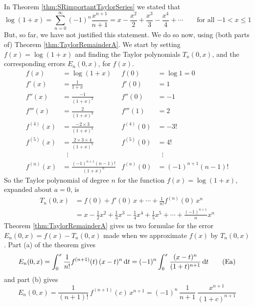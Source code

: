 \begin{eg}\label{eg:integralRemainder}
In Theorem \ref{thm:SRimportantTaylorSeries} we stated that
\begin{equation*}
\log(1+x) = \sum_{n=0}^\infty (-1)^n\frac{x^{n+1}}{n+1}
     = x-\frac{x^2}{2}+\frac{x^3}{3}-\frac{x^4}{4}+\cdots
    \qquad\text{for all $-1<x\le 1$} 
\tag{S1}\end{equation*}
But, so far, we have not justified this statement. We do so now, using (both parts of) Theorem \ref{thm:TaylorRemainderA}. We start by setting 
$f(x)=\log(1+x)$ and finding the Taylor polynomials $T_n(0,x)$, and the corresponding errors $E_n(0,x)$, for $f(x)$.
\begin{align*}
  f(x) &= \log(1+x) & f(0) &= \log 1 = 0 \\
  f'(x) &= \frac{1}{1+x} & f'(0) &= 1 \\
  f''(x) &= \frac{-1}{(1+x)^2} & f''(0) &= -1 \\
  f'''(x) &= \frac{2}{(1+x)^3} & f'''(1) &= 2 \\
  f^{(4)}(x) &= \frac{-2\times 3}{(1+x)^4} & f^{(4)}(0) &= -3! \\
  f^{(5)}(x) &= \frac{2\times 3\times 4}{(1+x)^5} & f^{(5)}(0) &= 4! \\
             &\ \ \ \vdots  &  &\ \ \ \vdots \\
  f^{(n)}(x)&=\frac{(-1)^{n+1}(n-1)!}{(1+x)^n} & f^{(n)}(0) &= (-1)^{n+1}(n-1)!
\end{align*}
So the Taylor polynomial of degree $n$ for the function $f(x)=\log(1+x)$,
expanded about $a=0$, is
\begin{align*}
T_n(0,x) &=f(0)+f'(0)\,x+\cdots+\tfrac{1}{n!}f^{(n)}(0)\, x^n \\
 &= x - \frac{1}{2}x^2 + \frac{1}{3}x^3 - \frac{1}{4}x^4 + \frac{1}{5}x^5 
           +\cdots + \frac{(-1)^{n+1}}{n}x^n
\end{align*}
Theorem \ref{thm:TaylorRemainderA} gives us two formulae for the 
error $E_n(0,x) = f(x) - T_n(0,x)$ made when we approximate $f(x)$ 
by $T_n(0,x)$. Part (a) of the theorem gives
\begin{equation*}
E_n(0,x) = \int_0^x \frac{1}{n!}f^{(n+1)}(t)\, (x-t)^n\,\mathrm{d}t
         = (-1)^n \int_0^x \frac{(x-t)^n}{(1+t)^{n+1}}\,\mathrm{d}t
\tag{Ea}\end{equation*}
and part (b) gives
\begin{equation*}
E_n(0,x)=\frac{1}{(n+1)!}\,f^{(n+1)}(c)\, x^{n+1}  
        = (-1)^n\,\frac{1}{n+1}\,\frac{x^{n+1}}{(1+c)^{n+1}}
\tag{Eb}\end{equation*}

\end{eg}
